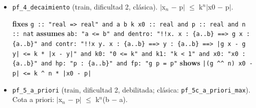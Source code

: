 \documentclass[11pt,a4paper]{article}
\begin{document}
\begin{itemize}
  {\footnotesize \textbf{fixes} \texttt{g :\allowbreak{}:\allowbreak{} "real =\allowbreak{}> real" and a b k x0 :\allowbreak{}:\allowbreak{} real and p q :\allowbreak{}:\allowbreak{} real} \textbf{assumes} \texttt{ab:\allowbreak{} "a <=\allowbreak{} b" and dentro:\allowbreak{} "!{}!x. x :\allowbreak{} \{a..b\} =\allowbreak{}=\allowbreak{}> g x :\allowbreak{} \{a..b\}" and contr:\allowbreak{} "!{}!x y. x :\allowbreak{} \{a..b\} =\allowbreak{}=\allowbreak{}> y :\allowbreak{} \{a..b\} =\allowbreak{}=\allowbreak{}> |\allowbreak{}g x -\allowbreak{} g y|\allowbreak{} <=\allowbreak{} k *\allowbreak{} |\allowbreak{}x -\allowbreak{} y|\allowbreak{}" and k0:\allowbreak{} "0 <=\allowbreak{} k" and k1:\allowbreak{} "k < 1" and x0:\allowbreak{} "x0 :\allowbreak{} \{a..b\}" and hp:\allowbreak{} "p :\allowbreak{} \{a..b\}" and fp:\allowbreak{} "g p =\allowbreak{} p" and hq:\allowbreak{} "q :\allowbreak{} \{a..b\}" and fq:\allowbreak{} "g q =\allowbreak{} q"} \textbf{shows} \texttt{p =\allowbreak{} q}\par}
  \item \texttt{pf\_\allowbreak{}4\_\allowbreak{}decaimiento} (train, dificultad 2, clásica). $|$x$_{n}$ $-$ p$|$ $\le $ k$^{n}|$x0 $-$ p$|$.\\
  {\footnotesize \textbf{fixes} \texttt{g :\allowbreak{}:\allowbreak{} "real =\allowbreak{}> real" and a b k x0 :\allowbreak{}:\allowbreak{} real and p :\allowbreak{}:\allowbreak{} real and n :\allowbreak{}:\allowbreak{} nat} \textbf{assumes} \texttt{ab:\allowbreak{} "a <=\allowbreak{} b" and dentro:\allowbreak{} "!{}!x. x :\allowbreak{} \{a..b\} =\allowbreak{}=\allowbreak{}> g x :\allowbreak{} \{a..b\}" and contr:\allowbreak{} "!{}!x y. x :\allowbreak{} \{a..b\} =\allowbreak{}=\allowbreak{}> y :\allowbreak{} \{a..b\} =\allowbreak{}=\allowbreak{}> |\allowbreak{}g x -\allowbreak{} g y|\allowbreak{} <=\allowbreak{} k *\allowbreak{} |\allowbreak{}x -\allowbreak{} y|\allowbreak{}" and k0:\allowbreak{} "0 <=\allowbreak{} k" and k1:\allowbreak{} "k < 1" and x0:\allowbreak{} "x0 :\allowbreak{} \{a..b\}" and hp:\allowbreak{} "p :\allowbreak{} \{a..b\}" and fp:\allowbreak{} "g p =\allowbreak{} p"} \textbf{shows} \texttt{|\allowbreak{}(\allowbreak{}g \textasciicircum{}\textasciicircum{} n) x0 -\allowbreak{} p|\allowbreak{} <=\allowbreak{} k \textasciicircum{} n *\allowbreak{} |\allowbreak{}x0 -\allowbreak{} p|\allowbreak{}}\par}
  \item \texttt{pf\_\allowbreak{}5\_\allowbreak{}a\_\allowbreak{}priori} (train, dificultad 2, debilitada; clásica: \texttt{pf\_\allowbreak{}5c\_\allowbreak{}a\_\allowbreak{}priori\_\allowbreak{}max}). Cota a priori: $|$x$_{n}$ $-$ p$|$ $\le $ k$^{n}$(b $-$ a).\\

\end{itemize}
\end{document}
